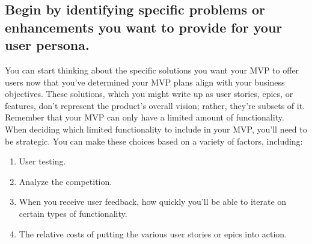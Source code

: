 \documentclass[paper=a4, fontsize=11pt]{scrartcl}
\numberwithin{equation}{section}		%
\numberwithin{figure}{section}			%
\numberwithin{table}{section}				%
\begin{document}
\subsection{Begin by identifying specific problems or enhancements you want to provide for your user persona.}
You can start thinking about the specific solutions you want your MVP to offer users now that you've determined your MVP plans align with your business objectives. These solutions, which you might write up as user stories, epics, or features, don't represent the product's overall vision; rather, they're subsets of it. Remember that your MVP can only have a limited amount of functionality.
When deciding which limited functionality to include in your MVP, you'll need to be strategic. You can make these choices based on a variety of factors, including:
\begin{enumerate}
    \item User testing.
    \item Analyze the competition.
    \item When you receive user feedback, how quickly you'll be able to iterate on certain types of functionality.
    \item The relative costs of putting the various user stories or epics into action.
\end{enumerate}
\newpage


\newpage

\end{document}
